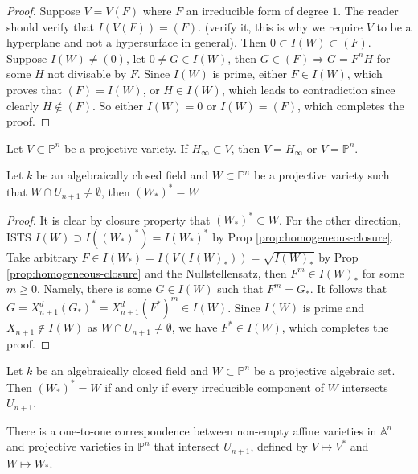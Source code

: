 \documentclass{note-eng}
\begin{document}
\begin{proof}
    Suppose $V = V(F)$ where $F$ an irreducible form of degree $1$. The reader should verify that $I(V(F)) = (F)$. (\TODO verify it, this is why we require $V$ to be a hyperplane and not a hypersurface in general). Then $0 \subset I(W) \subset (F)$. Suppose $I(W) \ne (0)$, let $0 \ne G \in I(W)$, then $G \in (F) \Rightarrow G = F^nH$ for some $H$ not divisable by $F$. Since $I(W)$ is prime, either $F \in I(W)$, which proves that $(F) = I(W)$, or $H \in I(W)$, which leads to contradiction since clearly $H \notin (F)$. So either $I(W) = 0$ or $I(W) = (F)$, which completes the proof.
\end{proof}

\begin{corollary}
    Let $V \subset \mathbb{P}^n$ be a projective variety. If $H_{\infty} \subset V$, then $V = H_{\infty}$ or $V = \mathbb{P}^n$.
\end{corollary}

\fi

\begin{proposition}
    Let $k$ be an algebraically closed field and $W \subset \mathbb{P}^n$ be a projective variety such that $W \cap U_{n + 1} \ne \emptyset$, then $(W_\ast)^\ast = W$
\end{proposition}

\begin{proof}
    It is clear by closure property that $(W_\ast)^\ast \subset W$. For the other direction, ISTS $I(W) \supset I((W_\ast)^\ast) = I(W_\ast)^\ast$ by Prop \ref{prop:homogeneous-closure}. Take arbitrary $F \in I(W_\ast) = I(V(I(W)_\ast)) = \sqrt{I(W)_\ast}$ by Prop \ref{prop:homogeneous-closure} and the Nullstellensatz, then $F^m \in I(W)_\ast$ for some $m \ge 0$. Namely, there is some $G \in I(W)$ such that $F^m = G_\ast$. It follows that $G = X_{n + 1}^d (G_\ast)^\ast = X_{n + 1}^d (F^\ast)^m \in I(W)$. Since $I(W)$ is prime and $X_{n + 1} \notin I(W)$ as $W \cap U_{n + 1} \ne \emptyset$, we have $F^\ast \in I(W)$, which completes the proof.
\end{proof}

\begin{corollary}
    Let $k$ be an algebraically closed field and $W \subset \mathbb{P}^n$ be a projective algebraic set. Then $(W_\ast)^\ast = W$ if and only if every irreducible component of $W$ intersects $U_{n + 1}$.
\end{corollary}

\begin{corollary}
    There is a one-to-one correspondence between non-empty affine varieties in $\mathbb{A}^n$ and projective varieties in $\mathbb{P}^n$ that intersect $U_{n + 1}$, defined by $V \mapsto V^\ast$ and $W \mapsto W_\ast$.
\end{corollary}
\end{document}
